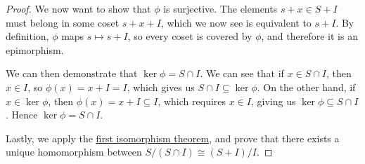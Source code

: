 \begin{proof}
    We now want to show that \(\phi\) is surjective.
    The elements \(s+x \in S+I\) must belong in some coset \(s+x+I\),
    which we now see is equivalent to \(s+I\).
    By definition, \(\phi\) maps \(s \mapsto s+I\),
    so every coset is covered by \(\phi\),
    and therefore it is an epimorphism.

    We can then demonstrate that \(\ker\phi = S \cap I\).
    We can see that if \(x \in S \cap I\),
    then \(x \in I\), so \(\phi(x) = x+I = I\),
    which gives us \(S \cap I \subseteq \ker\phi\).
    On the other hand, if \(x \in \ker\phi\),
    then \(\phi(x) = x+I \subseteq I\),
    which requires \(x \in I\), giving us \(\ker\phi \subseteq S \cap I\).
    Hence \(\ker\phi = S \cap I\).

    Lastly, we apply the \hyperref[thm:iso-2-ring]{first isomorphism theorem},
    and prove that there exists a unique homomorphism
    between \(S/(S \cap I) \cong (S+I)/I\).
\end{proof}

